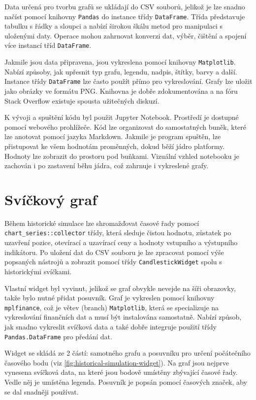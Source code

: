 Data určená pro tvorbu grafů se ukládají do CSV souborů, jelikož je lze snadno načíst pomocí knihovny \texttt{Pandas} do instance třídy \texttt{DataFrame}.
Třída představuje tabulku s řádky a sloupci a nabízí širokou škálu metod pro manipulaci s uloženými daty.
Operace mohou zahrnovat konverzi dat, výběr, čištění a spojení více instancí tříd \texttt{DataFrame}.

Jakmile jsou data připravena, jsou vykreslena pomocí knihovny \texttt{Matplotlib}.
Nabízí způsoby, jak upřesnit typ grafu, legendu, nadpis, štítky, barvy a další.
Instance třídy \texttt{DataFrame} lze často použít přímo pro vykreslování.
Grafy lze uložit jako obrázky ve formátu PNG.
Knihovna je dobře zdokumentována a na fóru Stack Overflow existuje spousta užitečných diskuzí.

K vývoji a spuštění kódu byl použit Jupyter Notebook.
Prostředí je dostupné pomocí webového prohlížeče.
Kód lze organizovat do samostatných buněk, které lze anotovat pomocí jazyka Markdown.
Jakmile je program spuštěn, lze přistupovat ke všem hodnotám proměnných, dokud běží jádro platformy.
Hodnoty lze zobrazit do prostoru pod buňkami.
Vizuální vzhled notebooku je zachován i po zastavení běhu jádra, což zahrnuje i vykreslené grafy.

\section{Svíčkový graf}
Během historické simulace lze shromažďovat časové řady pomocí \texttt{chart\_series::collector} třídy, která sleduje čistou hodnotu, zůstatek po uzavření pozice, otevírací a uzavírací ceny a hodnoty vstupního a výstupního indikátoru.
Po uložení dat do CSV souboru je lze zpracovat pomocí výše popsaných nástrojů a zobrazit pomocí třídy \texttt{CandlestickWidget} spolu s historickými svíčkami.

Vlastní widget byl vyvinut, jelikož se graf obvykle nevejde na šíři obrazovky, takže bylo nutné přidat posuvník.
Graf je vykreslen pomocí knihovny \texttt{mplfinance}, což je větev (branch) \texttt{Matplotlib}, která se specializuje na vykreslování finančních dat a musí být instalována samostatně.
Nabízí způsob, jak snadno vykreslit svíčková data a také dobře integruje použití třídy \texttt{Pandas.DataFrame} pro předání dat.

Widget se skládá ze 2 částí: samotného grafu a posuvníku pro určení počátečního časového bodu (viz \ref{fig:historical-simulation-widget}).
Na graf jsou nejprve vynesena svíčková data, na které jsou bodově umístěny zbývající časové řady.
Vedle něj je umístěna legenda.
Posuvník je popsán pomocí časových značek, aby se dal snadněji používat.

